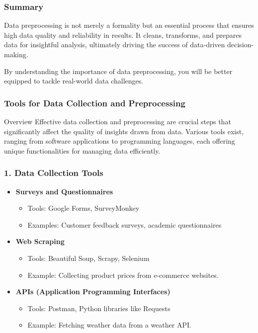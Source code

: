 \documentclass[aspectratio=169]{beamer}
\begin{document}
\begin{frame}[fragile]
  \frametitle{Summary}
  Data preprocessing is not merely a formality but an essential process that ensures high data quality and reliability in results. 
  It cleans, transforms, and prepares data for insightful analysis, ultimately driving the success of data-driven decision-making.
  
  By understanding the importance of data preprocessing, you will be better equipped to tackle real-world data challenges.
\end{frame}

\begin{frame}
    \frametitle{Tools for Data Collection and Preprocessing}
    \begin{block}{Overview}
        Effective data collection and preprocessing are crucial steps that significantly affect the quality of insights drawn from data. Various tools exist, ranging from software applications to programming languages, each offering unique functionalities for managing data efficiently.
    \end{block}
\end{frame}

\begin{frame}
    \frametitle{1. Data Collection Tools}
    \begin{itemize}
        \item \textbf{Surveys and Questionnaires}
        \begin{itemize}
            \item Tools: Google Forms, SurveyMonkey
            \item Examples: Customer feedback surveys, academic questionnaires
        \end{itemize}
        
        \item \textbf{Web Scraping}
        \begin{itemize}
            \item Tools: Beautiful Soup, Scrapy, Selenium
            \item Example: Collecting product prices from e-commerce websites.
        \end{itemize}
        
        \item \textbf{APIs (Application Programming Interfaces)}
        \begin{itemize}
            \item Tools: Postman, Python libraries like Requests
            \item Example: Fetching weather data from a weather API.
        \end{itemize}
    \end{itemize}
\end{frame}
\end{document}
